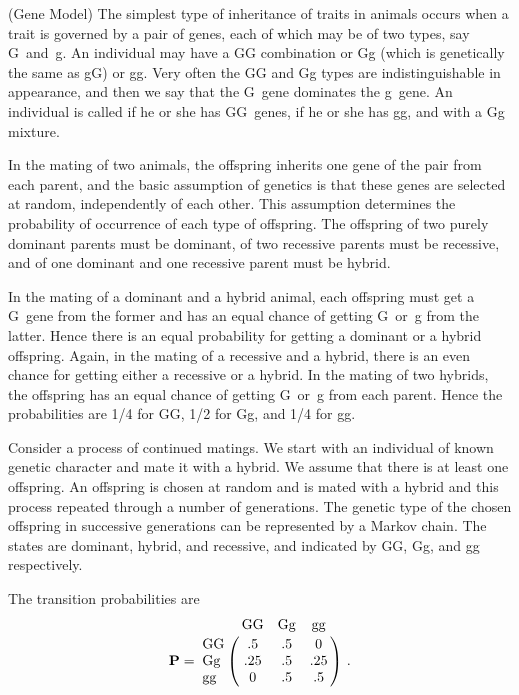 \begin{example}\label{exam 11.1.7}
(Gene Model) The simplest type of inheritance of traits in animals occurs when
a trait is
governed by a pair of genes, each of which may be of two types, say G~and~g. 
An individual may have a GG combination or Gg (which is genetically the same as
gG) or gg.  Very often the GG and Gg types are indistinguishable in appearance,
and then we say that the G~gene dominates the g~gene.  An individual is called
  if he or she has GG~genes,  if he or she has
gg, and  with a Gg mixture.
\par
In the mating of two animals, the offspring inherits one gene of the pair from
each parent, and the basic assumption of genetics is that these genes are
selected at random, independently of each other.  This assumption determines
the probability of occurrence of each type of offspring.  The offspring of two
purely dominant parents must be dominant, of two recessive parents must be
recessive, and of one dominant and one recessive parent must be hybrid.
\par
In the mating of a dominant and a hybrid animal, each offspring must get a
G~gene from the former and has an equal chance of getting G~or~g from the
latter.  Hence there is an equal probability for getting a dominant or a hybrid
offspring.  Again, in the mating of a recessive and a hybrid, there is an even
chance for getting either a recessive or a hybrid.  In the mating of two
hybrids, the offspring has an equal chance of getting G~or~g from each parent. 
Hence the probabilities are 1/4 for GG, 1/2 for Gg, and 1/4 for gg.
\par
Consider a process of continued matings.  We start with an individual of
known genetic character and mate it with a hybrid.  We assume that there is at
least
one offspring.  An offspring is chosen at random and is mated with a hybrid and
this process
repeated through a number of generations.  The genetic type of the chosen
offspring in
successive generations can be represented by a Markov chain.  The states are
dominant, hybrid, and recessive, and indicated by GG, Gg, and gg respectively.
\par
The transition probabilities are
$$
\mat{P} = \bordermatrix{
          &\mbox{GG} & \mbox{Gg} & \mbox{gg} \cr
\mbox{GG} &  .5      & .5        &   0       \cr
\mbox{Gg} & .25      & .5        & .25       \cr
\mbox{gg} &   0      & .5        &  .5       }\ . 
$$
\end{example}

